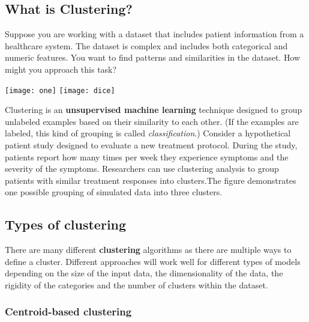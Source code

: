 \subsection{What is Clustering?}
\date{}

	
	\maketitle
	
	Suppose you are working with a dataset that includes patient information from a healthcare system. The dataset is complex and includes both categorical and numeric features. You want to find patterns and similarities in the dataset. How might you approach this task?


	\texttt{[image: one]}   %
	\texttt{[image: dice]}
	
	\par Clustering is an \textbf{unsupervised machine learning} technique designed to group unlabeled examples based on their similarity to each other. (If the examples are labeled, this kind of grouping is called \emph{classification}.) Consider a hypothetical patient study designed to evaluate a new treatment protocol. During the study, patients report how many times per week they experience symptoms and the severity of the symptoms. Researchers can use clustering analysis to group patients with similar treatment responses into clusters.The figure demonstrates one possible grouping of simulated data into three clusters.
	
\subsection{Types of clustering}

\par There are many different \textbf{clustering} algorithms as there are multiple ways to define a cluster. Different approaches will work well for different types of models depending on the size of the input data, the dimensionality of the data, the rigidity of the categories and the number of clusters within the dataset.
\subsubsection{Centroid-based clustering}

